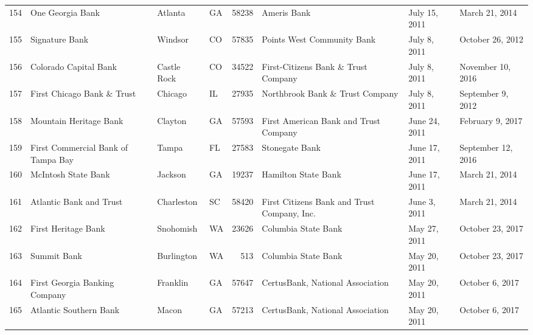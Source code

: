 \begin{tabular}{llllrlll}
154 &                                   One Georgia Bank &             Atlanta &  GA &  58238 &                                        Ameris Bank &       July 15, 2011 &      March 21, 2014 \\
155 &                                     Signature Bank &             Windsor &  CO &  57835 &                         Points West Community Bank &        July 8, 2011 &    October 26, 2012 \\
156 &                              Colorado Capital Bank &         Castle Rock &  CO &  34522 &                First-Citizens Bank \& Trust Company &        July 8, 2011 &   November 10, 2016 \\
157 &                         First Chicago Bank \& Trust &             Chicago &  IL &  27935 &                    Northbrook Bank \& Trust Company &        July 8, 2011 &   September 9, 2012 \\
158 &                             Mountain Heritage Bank &             Clayton &  GA &  57593 &              First American Bank and Trust Company &       June 24, 2011 &    February 9, 2017 \\
159 &                 First Commercial Bank of Tampa Bay &               Tampa &  FL &  27583 &                                     Stonegate Bank &       June 17, 2011 &  September 12, 2016 \\
160 &                                McIntosh State Bank &             Jackson &  GA &  19237 &                                Hamilton State Bank &       June 17, 2011 &      March 21, 2014 \\
161 &                            Atlantic Bank and Trust &          Charleston &  SC &  58420 &        First Citizens Bank and Trust Company, Inc. &        June 3, 2011 &      March 21, 2014 \\
162 &                                First Heritage Bank &           Snohomish &  WA &  23626 &                                Columbia State Bank &        May 27, 2011 &    October 23, 2017 \\
163 &                                        Summit Bank &          Burlington &  WA &    513 &                                Columbia State Bank &        May 20, 2011 &    October 23, 2017 \\
164 &                      First Georgia Banking Company &            Franklin &  GA &  57647 &                   CertusBank, National Association &        May 20, 2011 &     October 6, 2017 \\
165 &                             Atlantic Southern Bank &               Macon &  GA &  57213 &                   CertusBank, National Association &        May 20, 2011 &     October 6, 2017 \\

\end{tabular}
